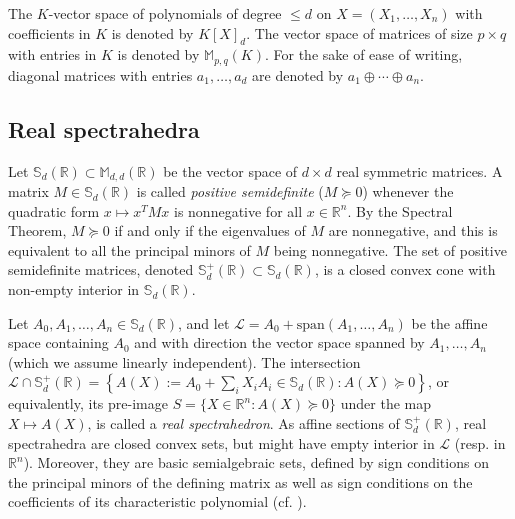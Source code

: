 \documentclass[a4paper,12pt]{article}
\newcommand{\R}{\mathbb{R}} %
\newcommand{\allmat}{\mathbb{M}} %
\newcommand{\sym}{\mathbb{S}} %
\renewcommand{\span}[1]{{\text{span}(#1)}} %
\newcommand{\calL}{\mathcal{L}} %
\begin{document}
The $K$-vector space of polynomials of degree $\leq d$ on $X=(X_1,\ldots,X_n)$
with coefficients in $K$ is denoted by $K[X]_{d}$. The vector space of matrices of
size $p \times q$ with entries in $K$ is denoted by $\allmat_{p,q}(K)$. For the sake
of ease of writing, diagonal matrices with entries $a_1,\ldots,a_d$ are denoted by
$a_1 \oplus \cdots \oplus a_n$.

\subsection{Real spectrahedra}

Let $\sym_d(\R) \subset \allmat_{d,d}(\R)$ be the vector space of $d \times d$ real symmetric
matrices. A matrix $M \in \sym_d(\R)$
is called {\it positive semidefinite} ($M \succeq 0$) whenever the quadratic
form $x \mapsto x^TMx$ is nonnegative for all $x\in \R^n$. By the Spectral Theorem, $M \succeq 0$
if and only if the eigenvalues of $M$ are nonnegative, and this is equivalent to all the principal minors
of $M$ being nonnegative. The set of positive semidefinite matrices, denoted $\sym_d^+(\R) \subset \sym_d(\R)$,
is a closed convex cone with non-empty interior in $\sym_d(\R)$.

Let $A_0,A_1,\ldots,A_n \in \sym_d(\R)$, and let $\calL = A_0+\span{A_1,\ldots,A_n}$ be the affine space
containing $A_0$ and with direction the vector space spanned by $A_1,\ldots,A_n$ (which we assume linearly
independent). The intersection
$\calL \cap \sym_d^+(\R) = \left\{A(X) := A_0+\sum_i X_i A_i \in \sym_d(\R) : A(X) \succeq 0\right\}$, or
equivalently, its pre-image $S = \{X \in \R^n : A(X) \succeq 0\}$ under the map $X \mapsto A(X)$, is called
a {\it real spectrahedron}. As affine sections of $\sym_d^+(\R)$, real spectrahedra are closed convex sets,
but might have empty interior in $\calL$ (resp. in $\R^n$). Moreover, they are basic semialgebraic sets,
defined by sign conditions on the principal minors of the defining matrix as well as sign conditions on the
coefficients of its characteristic polynomial (cf. ).
\end{document}
